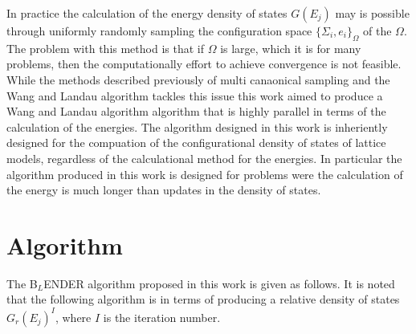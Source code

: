 \documentclass[aps,prl,reprint,superscriptaddress,showkeys]{revtex4-1}
\begin{document}
   In practice the calculation of the energy density of states $G(E_j)$  may  is  possible through uniformly randomly sampling the configuration space $\{ \Sigma_i, e_i \}_\Omega $ of the $\Omega$.  The problem with this method is that if $\Omega$ is large, which it is for many problems,  then the computationally effort to achieve convergence is not feasible. While the methods described previously of multi canaonical sampling and the Wang and Landau algorithm tackles this issue this work aimed to produce a Wang and Landau algorithm algorithm that is highly parallel in terms of the calculation of the energies. The algorithm designed in this work is inheriently designed for the compuation of the configurational density of states of lattice models, regardless of the calculational method for the energies. In particular the algorithm produced in this work is designed for problems were the calculation of the energy is much longer than updates in the density of states. 

\section{Algorithm}
   
The B$_{L}$ENDER algorithm proposed in this work  is given as follows. It is noted that the following algorithm is in terms of producing a relative density of states $G_{r}(E_j)^I$, where $I$ is the iteration number. 
\end{document}
